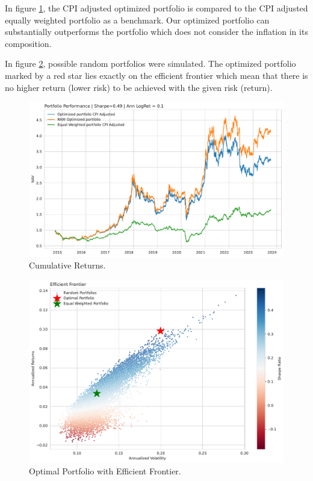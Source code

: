 \documentclass{article}
\begin{document}
In figure \ref{fig:mesh4}, the CPI adjusted optimized portfolio is compared to the CPI adjusted equally weighted portfolio as a benchmark. Our optimized portfolio can substantially outperforms the portfolio which does not consider the inflation in its composition.

In figure \ref{fig:mesh5}, possible random portfolios were simulated. The optimized portfolio marked by a red star lies exactly on the efficient frontier which mean that there is no higher return (lower risk) to be achieved with the given risk (return).

\begin{figure}[H]
    \centering
    \includegraphics[width=1\textwidth]{paper/figure/PNL.pdf}
    \caption{Cumulative Returns.}
    \label{fig:mesh4}
\end{figure}

\begin{figure}[H]
    \centering
    \includegraphics[width=1\textwidth]{paper/figure/Optimal_PF.pdf}
    \caption{Optimal Portfolio with Efficient Frontier.}
    \label{fig:mesh5}
\end{figure}
\end{document}
